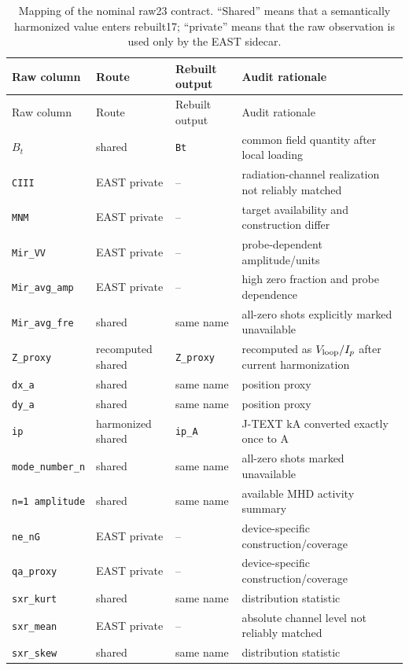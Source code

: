 \documentclass[10pt]{article}
\newcommand{\jtext}{J-TEXT}
\newcommand{\east}{EAST}
\newcommand{\code}[1]{\nolinkurl{#1}}
\begin{document}
\begin{longtable}{@{}p{28mm}p{27mm}p{31mm}p{68mm}@{}}
\caption{Mapping of the nominal raw23 contract.  ``Shared'' means that a semantically harmonized value enters rebuilt17; ``private'' means that the raw observation is used only by the \east{} sidecar.}\\
\toprule
Raw column & Route & Rebuilt output & Audit rationale \\
\midrule
\endfirsthead
\toprule
Raw column & Route & Rebuilt output & Audit rationale \\
\midrule
\endhead
$B_t$ & shared & \code{Bt} & common field quantity after local loading \\
\code{CIII} & \east{} private & -- & radiation-channel realization not reliably matched \\
\code{MNM} & \east{} private & -- & target availability and construction differ \\
\code{Mir\_VV} & \east{} private & -- & probe-dependent amplitude/units \\
\code{Mir\_avg\_amp} & \east{} private & -- & high zero fraction and probe dependence \\
\code{Mir\_avg\_fre} & shared & same name & all-zero shots explicitly marked unavailable \\
\code{Z\_proxy} & recomputed shared & \code{Z\_proxy} & recomputed as $V_{\rm loop}/I_p$ after current harmonization \\
\code{dx\_a} & shared & same name & position proxy \\
\code{dy\_a} & shared & same name & position proxy \\
\code{ip} & harmonized shared & \code{ip\_A} & \jtext{} kA converted exactly once to A \\
\code{mode\_number\_n} & shared & same name & all-zero shots marked unavailable \\
\code{n=1 amplitude} & shared & same name & available MHD activity summary \\
\code{ne\_nG} & \east{} private & -- & device-specific construction/coverage \\
\code{qa\_proxy} & \east{} private & -- & device-specific construction/coverage \\
\code{sxr\_kurt} & shared & same name & distribution statistic \\
\code{sxr\_mean} & \east{} private & -- & absolute channel level not reliably matched \\
\code{sxr\_skew} & shared & same name & distribution statistic \\

\end{longtable}
\end{document}
